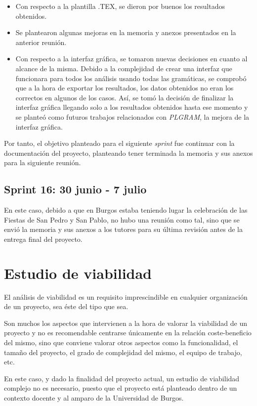 \begin{itemize}
\item Con respecto a la plantilla .TEX, se dieron por buenos los resultados obtenidos.
\item Se plantearon algunas mejoras en la memoria y anexos presentados en la anterior reunión.
\item Con respecto a la interfaz gráfica, se tomaron nuevas decisiones en cuanto al alcance de la misma. Debido a la complejidad de crear una interfaz que funcionara para todos los análisis usando todas las gramáticas, se comprobó que a la hora de exportar los resultados, los datos obtenidos no eran los correctos en algunos de los casos. Así, se tomó la decisión de finalizar la interfaz gráfica llegando solo a los resultados obtenidos hasta ese momento y se planteó como futuros trabajos relacionados con \textit{PLGRAM}, la mejora de la interfaz gráfica.
\end{itemize}

Por tanto, el objetivo planteado para el siguiente \textit{sprint} fue continuar con la documentación del proyecto, planteando tener terminada la memoria y sus anexos para la siguiente reunión.

\subsection{Sprint 16: 30 junio - 7 julio}

En este caso, debido a que en Burgos estaba teniendo lugar la celebración de las Fiestas de San Pedro y San Pablo, no hubo una reunión como tal, sino que se envió la memoria y sus anexos a los tutores para su última revisión antes de la entrega final del proyecto.

\section{Estudio de viabilidad}

El análisis de viabilidad es un requisito imprescindible en cualquier organización de un proyecto, sea éste del tipo que sea.

Son muchos los aspectos que intervienen a la hora de valorar la viabilidad de un proyecto y no es recomendable centrarse únicamente en la relación coste-beneficio del mismo, sino que conviene valorar otros aspectos como la funcionalidad, el tamaño del proyecto, el grado de complejidad del mismo, el equipo de trabajo, etc.

En este caso, y dado la finalidad del proyecto actual, un estudio de viabilidad complejo no es necesario, puesto que el proyecto está planteado dentro de un contexto docente y al amparo de la Universidad de Burgos. 

